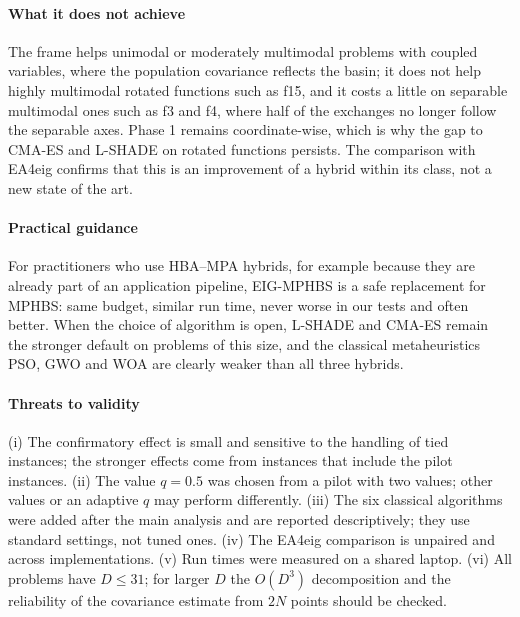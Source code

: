 \documentclass[preprint,12pt,authoryear]{elsarticle}
\theoremstyle{remark}
\begin{document}
\paragraph{What it does not achieve} The frame helps unimodal or moderately multimodal problems with coupled variables,
where the population covariance reflects the basin; it does not help highly multimodal rotated functions such as f15,
and it costs a little on separable multimodal ones such as f3 and f4, where half of the exchanges no longer follow the
separable axes. Phase 1 remains coordinate-wise, which is why the gap to CMA-ES and L-SHADE on rotated functions
persists. The comparison with EA4eig confirms that this is an improvement of a hybrid within its class, not a new
state of the art.

\paragraph{Practical guidance} For practitioners who use HBA--MPA hybrids, for example because they are already part of
an application pipeline, EIG-MPHBS is a safe replacement for MPHBS: same budget, similar run time, never worse in our
tests and often better. When the choice of algorithm is open, L-SHADE and CMA-ES remain the stronger default on
problems of this size, and the classical metaheuristics PSO, GWO and WOA are clearly weaker than all three hybrids.

\paragraph{Threats to validity} (i) The confirmatory effect is small and sensitive to the handling of tied instances;
the stronger effects come from instances that include the pilot instances. (ii) The value $q=0.5$ was chosen from a
pilot with two values; other values or an adaptive $q$ may perform differently. (iii) The six classical algorithms were
added after the main analysis and are reported descriptively; they use standard settings, not tuned ones. (iv) The
EA4eig comparison is unpaired and across implementations. (v) Run times were measured on a shared laptop. (vi) All
problems have $D\le31$; for larger $D$ the $O(D^3)$ decomposition and the reliability of the covariance estimate from
$2N$ points should be checked.

\end{document}
